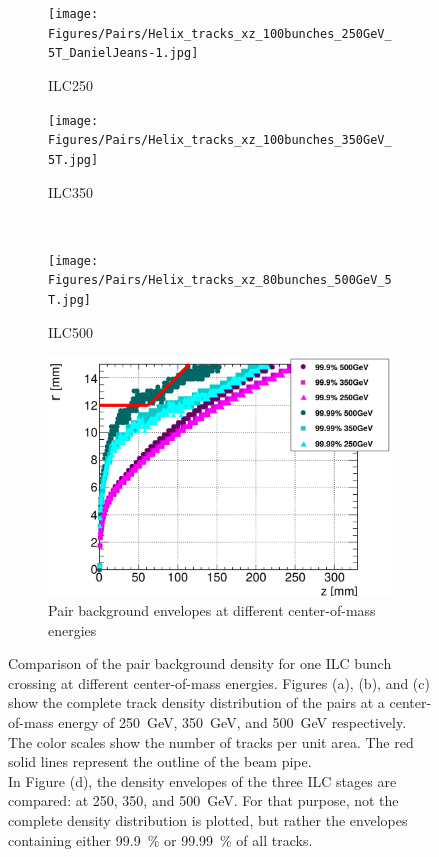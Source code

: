  \begin{figure}
 \centering
  \begin{subfigure}[t]{0.49\textwidth}
   \centering
    \texttt{[image: Figures/Pairs/Helix\_tracks\_xz\_100bunches\_250GeV\_5T\_DanielJeans-1.jpg]}
   \caption{ILC250}
   \end{subfigure}
   \hfill
    \begin{subfigure}[t]{0.49\textwidth}
   \centering
    \texttt{[image: Figures/Pairs/Helix\_tracks\_xz\_100bunches\_350GeV\_5T.jpg]}
   \caption{ILC350}
   \end{subfigure}\\
  \begin{subfigure}[t]{0.49\textwidth}
   \centering
    \texttt{[image: Figures/Pairs/Helix\_tracks\_xz\_80bunches\_500GeV\_5T.jpg]}
   \caption{ILC500}
   \end{subfigure}
   \hfill
    \begin{subfigure}[t]{0.49\textwidth}
   \centering
    \includegraphics[width=\textwidth]{Figures/Pairs/HelixEnvelopes_COMPARISON_xz_500_350_250_comparison_EDITED_2.png}
   \caption{Pair background envelopes at different center-of-mass energies}
   \end{subfigure}
   \caption[Pair background density distributions at different center-of-mass energies]{Comparison of the pair background density for one ILC bunch crossing at different center-of-mass energies.
   Figures (a), (b), and (c) show the complete track density distribution of the pairs at a center-of-mass energy of \SI[detect-all]{250}{\GeV}, \SI[detect-all]{350}{\GeV}, and \SI[detect-all]{500}{\GeV} respectively.
   The color scales show the number of tracks per unit area.
   The red solid lines represent the outline of the beam pipe.
   \\In Figure (d), the density envelopes of the three ILC stages are compared: at 250, 350, and \SI[detect-all]{500}{\GeV}.
   For that purpose, not the complete density distribution is plotted, but rather the envelopes containing either \SI[detect-all]{99.9}{\percent} or \SI[detect-all]{99.99}{\percent} of all tracks.
   }
   \label{fig:PairBkg:Density_Comp}
 \end{figure}

